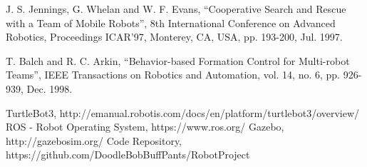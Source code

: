 \documentclass[letterpaper, 10 pt, conference]{ieeeconf}  %
\begin{document}
\begin{thebibliography}{99}
	
 J. S. Jennings, G. Whelan and W. F. Evans, ``Cooperative Search and Rescue with a Team of Mobile Robots'', 8th International Conference on Advanced Robotics, Proceedings ICAR'97, Monterey, CA, USA, pp. 193-200, Jul. 1997.

 T. Balch and R. C. Arkin, ``Behavior-based Formation Control for Multi-robot Teams'', IEEE Transactions on Robotics and Automation, vol. 14, no. 6, pp. 926-939, Dec. 1998.

 TurtleBot3, http://emanual.robotis.com/docs/en/platform/turtlebot3/overview/
 ROS - Robot Operating System, https://www.ros.org/
 Gazebo, http://gazebosim.org/
 Code Repository, https://github.com/DoodleBobBuffPants/RobotProject

\end{thebibliography}
\end{document}
